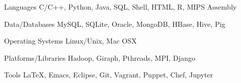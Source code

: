 

\begin{cvskills}

  \cvskill
    {Languages} %
    {C/C++, Python, Java, SQL, Shell, HTML, R, MIPS Assembly} %

  \cvskill
    {Data/Databases} %
    {MySQL, SQLite, Oracle, MongoDB, HBase, Hive, Pig} %

  \cvskill
    {Operating Systems} %
    {Linux/Unix, Mac OSX}

  \cvskill
    {Platforms/Libraries} %
    {Hadoop, Giraph, Pthreads, MPI, Django}

  \cvskill
    {Tools} %
    {LaTeX, Emacs, Eclipse, Git, Vagrant, Puppet, Chef, Jupyter} %

\end{cvskills}
